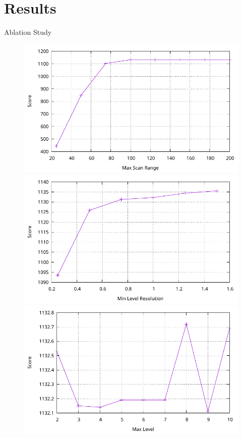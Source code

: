 \section{Results}

\begin{frame}{Ablation Study}
\begin{figure}
    \centering
    \begin{minipage}{0.49\textwidth}
        \centering
        \includegraphics[height=0.25\textheight]{../02-global-localization/plots/max_scan_range.pdf}
        \includegraphics[height=0.25\textheight]{../02-global-localization/plots/min_level_res.pdf}
        \includegraphics[height=0.25\textheight]{../02-global-localization/plots/max_level.pdf}

\end{minipage}
\end{figure}
\end{frame}
